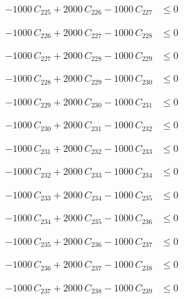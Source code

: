 \documentclass[a4paper,11pt]{article}
\begin{document}
\begin{align}
-1000\,C_{225} + 2000\,C_{226} - 1000\,C_{227} &\leq 0 \nonumber
\end{align}

\begin{align}
-1000\,C_{226} + 2000\,C_{227} - 1000\,C_{228} &\leq 0 \nonumber
\end{align}

\begin{align}
-1000\,C_{227} + 2000\,C_{228} - 1000\,C_{229} &\leq 0 \nonumber
\end{align}

\begin{align}
-1000\,C_{228} + 2000\,C_{229} - 1000\,C_{230} &\leq 0 \nonumber
\end{align}

\begin{align}
-1000\,C_{229} + 2000\,C_{230} - 1000\,C_{231} &\leq 0 \nonumber
\end{align}

\begin{align}
-1000\,C_{230} + 2000\,C_{231} - 1000\,C_{232} &\leq 0 \nonumber
\end{align}

\begin{align}
-1000\,C_{231} + 2000\,C_{232} - 1000\,C_{233} &\leq 0 \nonumber
\end{align}

\begin{align}
-1000\,C_{232} + 2000\,C_{233} - 1000\,C_{234} &\leq 0 \nonumber
\end{align}

\begin{align}
-1000\,C_{233} + 2000\,C_{234} - 1000\,C_{235} &\leq 0 \nonumber
\end{align}

\begin{align}
-1000\,C_{234} + 2000\,C_{235} - 1000\,C_{236} &\leq 0 \nonumber
\end{align}

\begin{align}
-1000\,C_{235} + 2000\,C_{236} - 1000\,C_{237} &\leq 0 \nonumber
\end{align}

\begin{align}
-1000\,C_{236} + 2000\,C_{237} - 1000\,C_{238} &\leq 0 \nonumber
\end{align}

\begin{align}
-1000\,C_{237} + 2000\,C_{238} - 1000\,C_{239} &\leq 0 \nonumber
\end{align}
\end{document}
